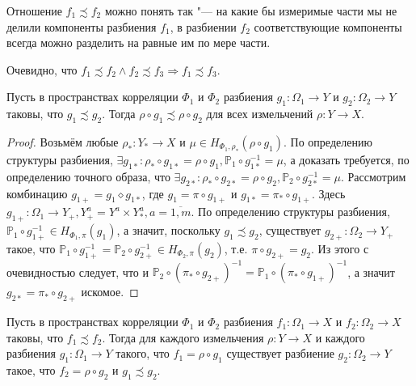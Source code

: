 Отношение $f_1 \precsim f_2$ можно понять так "--- на какие бы измеримые части мы не делили компоненты разбиения $f_1$, в разбиении $f_2$ соответствующие компоненты всегда можно разделить на равные им по мере части.

\begin{note}
	Очевидно, что $f_1 \precsim f_2 \wedge f_2 \precsim f_3 \Rightarrow f_1 \precsim f_3$.
\end{note}

\begin{lemma} \label{lemma:up}
	Пусть в пространствах корреляции $\Phi_1$ и $\Phi_2$ разбиения $g_1 : \Omega_1 \rightarrow Y$ и $g_2 : \Omega_2 \rightarrow Y$ таковы, что $g_1 \precsim g_2$. Тогда $\rho \circ g_1 \precsim \rho \circ g_2$ для всех измельчений $\rho : Y \rightarrow X$.
\end{lemma}

\begin{proof}
	Возьмём любые $\rho_* : Y_* \rightarrow X$ и $\mu \in H_{\Phi_1,\rho_*}(\rho \circ g_1)$. По определению структуры разбиения, $\exists g_{1*}: \rho_* \circ g_{1*} = \rho \circ g_1, \mathbb{P}_1 \circ g_{1*}^{-1} = \mu$, а доказать требуется, по определению точного образа, что $\exists g_{2*}: \rho_* \circ g_{2*} = \rho \circ g_2, \mathbb{P}_2 \circ g_{2*}^{-1} = \mu$. Рассмотрим комбинацию $g_{1+} = g_1 \diamond g_{1*}$, где $g_1 = \pi \circ g_{1+}$ и $g_{1*} = \pi_* \circ g_{1+}$. Здесь $g_{1+} : \Omega_1 \rightarrow Y_+, Y_+^a = Y^a \times Y_*^a, a=\overline{1,m}$. По определению структуры разбиения, $\mathbb{P}_1 \circ g_{1+}^{-1} \in H_{\Phi_1,\pi}(g_1)$, а значит, поскольку $g_1 \precsim g_2$, существует $g_{2+} : \Omega_2 \rightarrow Y_+$ такое, что $\mathbb{P}_1 \circ g_{1+}^{-1} = \mathbb{P}_2 \circ g_{2+}^{-1} \in H_{\Phi_2,\pi}(g_2)$, т.е. $\pi \circ g_{2+} = g_2$. Из этого с очевидностью следует, что и $\mathbb{P}_2 \circ (\pi_* \circ g_{2+})^{-1} = \mathbb{P}_1 \circ (\pi_* \circ g_{1+})^{-1}$, а значит $g_{2*} = \pi_* \circ g_{2+}$ искомое.
\end{proof}

\begin{lemma} \label{lemma:down}
	Пусть в пространствах корреляции $\Phi_1$ и $\Phi_2$ разбиения $f_1 : \Omega_1 \rightarrow X$ и $f_2 : \Omega_2 \rightarrow X$ таковы, что $f_1 \precsim f_2$. Тогда для каждого измельчения $\rho : Y \rightarrow X$ и каждого разбиения $g_1 : \Omega_1 \rightarrow Y$ такого, что $f_1 = \rho \circ g_1$ существует разбиение $g_2 : \Omega_2 \rightarrow Y$ такое, что $f_2 = \rho \circ g_2$ и $g_1 \precsim g_2$.
\end{lemma}

